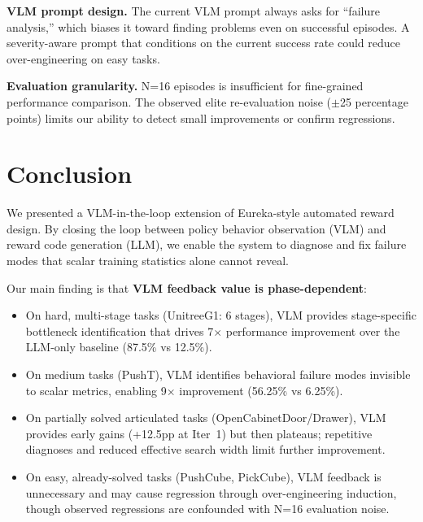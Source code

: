 \documentclass[conference]{IEEEtran}
\begin{document}

\textbf{VLM prompt design.}
The current VLM prompt always asks for ``failure analysis,'' which biases
it toward finding problems even on successful episodes. A severity-aware
prompt that conditions on the current success rate could reduce
over-engineering on easy tasks.

\textbf{Evaluation granularity.}
N=16 episodes is insufficient for fine-grained performance comparison.
The observed elite re-evaluation noise ($\pm$25 percentage points) limits
our ability to detect small improvements or confirm regressions.


\section{Conclusion}

We presented a VLM-in-the-loop extension of Eureka-style automated reward
design. By closing the loop between policy behavior observation (VLM) and reward
code generation (LLM), we enable the system to diagnose and fix failure modes
that scalar training statistics alone cannot reveal.

Our main finding is that \textbf{VLM feedback value is phase-dependent}:
\begin{itemize}
  \item On hard, multi-stage tasks (UnitreeG1: 6 stages), VLM provides
    stage-specific bottleneck identification that drives 7$\times$ performance
    improvement over the LLM-only baseline (87.5\% vs 12.5\%).
  \item On medium tasks (PushT), VLM identifies behavioral failure modes
    invisible to scalar metrics, enabling 9$\times$ improvement (56.25\% vs
    6.25\%).
  \item On partially solved articulated tasks (OpenCabinetDoor/Drawer), VLM
    provides early gains (+12.5pp at Iter~1) but then plateaus; repetitive
    diagnoses and reduced effective search width limit further improvement.
  \item On easy, already-solved tasks (PushCube, PickCube), VLM feedback is
    unnecessary and may cause regression through over-engineering induction,
    though observed regressions are confounded with N=16 evaluation noise.
\end{itemize}
\end{document}
